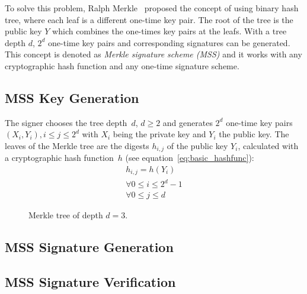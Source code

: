 To solve this problem, Ralph Merkle~\cite{cha:bg_merkletrees_Merkle_1979} proposed the concept of using binary hash tree, where each leaf is a different one-time key pair. The root of the tree is the public key $Y$  which combines the one-times key pairs at the leafs. With a tree depth $d$, $2^d$ one-time key pairs and corresponding signatures can be generated. %
This concept is denoted as \textit{Merkle signature scheme (MSS)} and it works with any cryptographic hash function and any one-time signature scheme. %

\subsection{MSS Key Generation}
The signer chooses the tree depth~$d$, $d \geq 2$ and generates $2^d$ one-time key pairs $(X_i, Y_i), i \leq j \leq 2^d$ with $X_i$ being the private key and $Y_i$ the public key. The leaves of the Merkle tree are the digests $h_{i,j}$ of the public key $Y_i$, calculated with a cryptographic hash function~$h$ (see equation~\ref{eq:basic_hashfunc}):
\begin{gather}
h_{i,j} = h(Y_i) \\
\forall 0 \leq i \leq 2^d - 1 \nonumber \\ 
\forall 0 \leq j \leq d \nonumber
\end{gather}

\begin{figure}
\label{img:merkle_tree}
\centering
\caption{Merkle tree of depth $d=3$.}
\end{figure}


\subsection{MSS Signature Generation}

\subsection{MSS Signature Verification}